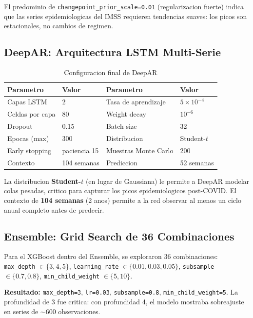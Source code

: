 \documentclass[12pt, letterpaper]{article}
\begin{document}
El predominio de \texttt{changepoint\_prior\_scale=0.01} (regularizacion fuerte) indica que las series epidemiologicas del IMSS requieren tendencias suaves: los picos son estacionales, no cambios de regimen.

\subsection{DeepAR: Arquitectura LSTM Multi-Serie}

\begin{table}[H]
\centering
\caption{Configuracion final de DeepAR}
\label{tab:deepar_hp}
\small
\begin{tabular}{ll|ll}
\toprule
\textbf{Parametro} & \textbf{Valor} & \textbf{Parametro} & \textbf{Valor} \\
\midrule
Capas LSTM          & 2              & Tasa de aprendizaje   & $5 \times 10^{-4}$ \\
Celdas por capa     & 80             & Weight decay          & $10^{-6}$ \\
Dropout             & 0.15           & Batch size            & 32 \\
Epocas (max)        & 300            & Distribucion          & Student-$t$ \\
Early stopping      & paciencia 15   & Muestras Monte Carlo  & 200 \\
Contexto            & 104 semanas    & Prediccion            & 52 semanas \\
\bottomrule
\end{tabular}
\end{table}

La distribucion \textbf{Student-$t$} (en lugar de Gaussiana) le permite a DeepAR modelar colas pesadas, critico para capturar los picos epidemiologicos post-COVID. El contexto de \textbf{104 semanas} (2 anos) permite a la red observar al menos un ciclo anual completo antes de predecir.

\subsection{Ensemble: Grid Search de 36 Combinaciones}

Para el XGBoost dentro del Ensemble, se exploraron 36 combinaciones:
\texttt{max\_depth} $\in \{3,4,5\}$, \texttt{learning\_rate} $\in \{0.01, 0.03, 0.05\}$, \texttt{subsample} $\in \{0.7, 0.8\}$, \texttt{min\_child\_weight} $\in \{5, 10\}$.

\textbf{Resultado:} \texttt{max\_depth=3}, \texttt{lr=0.03}, \texttt{subsample=0.8}, \texttt{min\_child\_weight=5}. La profundidad de 3 fue critica: con profundidad 4, el modelo mostraba sobreajuste en series de $\sim$600 observaciones.
\end{document}
